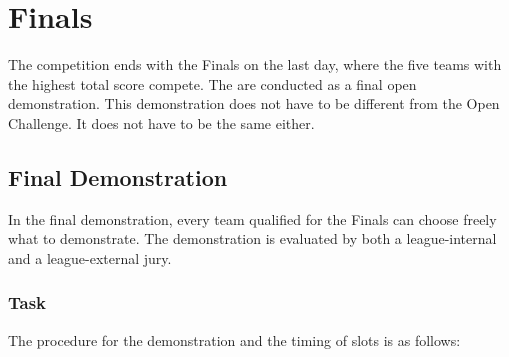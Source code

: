 \chapter{Finals}

The competition ends with the Finals on the last day, where the five teams with the highest total score compete.
The  are conducted as a final open demonstration.
This demonstration does not have to be different from the Open Challenge. 
It does not have to be the same either.

\section{Final Demonstration}
In the final demonstration, every team qualified for the Finals can choose freely what to demonstrate. 
The demonstration is evaluated by both a league-internal and a league-external jury.

\subsection{Task}
The procedure for the demonstration and the timing of slots is as follows:

